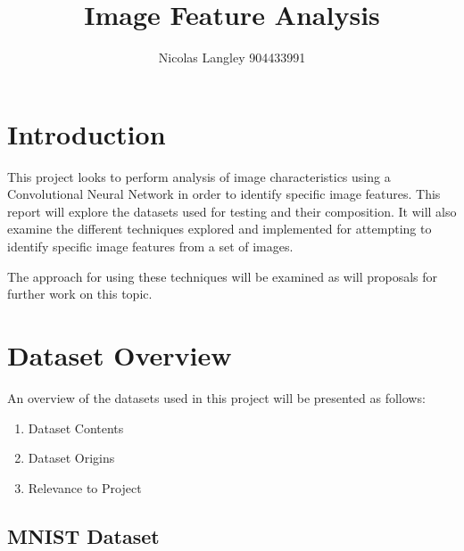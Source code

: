 \documentclass[12pt, titlepage]{article}
\begin{document}
 



\title{Image Feature Analysis}
\author{Nicolas Langley 904433991}
\maketitle
\section{Introduction}

This project looks to perform analysis of image characteristics using a Convolutional
Neural Network in order to identify specific image features. This report will explore the datasets used
for testing and their composition. It will also examine the different techniques explored and implemented for
attempting to identify specific image features from a set of images.

The approach for using these techniques will be examined as will proposals for further work on this topic.

\section{Dataset Overview}

An overview of the datasets used in this project will be presented as follows:
\begin{enumerate}
  \item Dataset Contents
  \item Dataset Origins
  \item Relevance to Project
\end{enumerate}

\subsection{MNIST Dataset}
\end{document}
